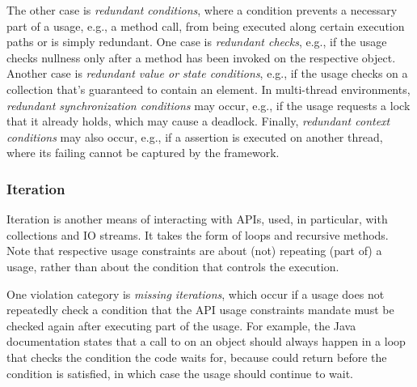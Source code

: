 The other case is \emph{redundant conditions}, where a condition prevents a necessary part of a usage, e.g., a method call, from being executed along certain execution paths or is simply redundant.
One case is \emph{redundant  checks}, e.g., if the usage checks nullness only after a method has been invoked on the respective object.
Another case is \emph{redundant value or state conditions}, e.g., if the usage checks  on a collection that's guaranteed to contain an element.
In multi-thread environments, \emph{redundant synchronization conditions} may occur, e.g., if the usage requests a lock that it already holds, which may cause a deadlock.
Finally, \emph{redundant context conditions} may also occur, e.g., if a  assertion is executed on another thread, where its failing cannot be captured by the  framework.


\subsubsection*{Iteration}

Iteration is another means of interacting with APIs, used, in particular, with collections and IO streams.
It takes the form of loops and recursive methods.
Note that respective usage constraints are about (not) repeating (part of) a usage, rather than about the condition that controls the execution.

One violation category is \emph{missing iterations}, which occur if a usage does not repeatedly check a condition that the API usage constraints mandate must be checked again after executing part of the usage.
For example, the Java documentation states that a call to  on an object should always happen in a loop that checks the condition the code waits for, because  could return before the condition is satisfied, in which case the usage should continue to wait.

